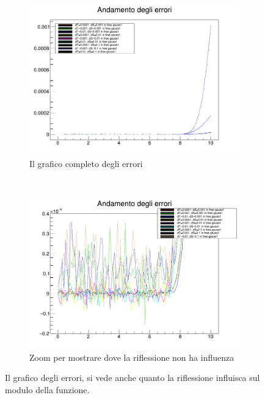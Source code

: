 \begin{figure}[hbt]
  \centering
  \begin{subfigure}[b]{0.45\textwidth}
    \includegraphics[width=\linewidth]{IMG/e_g1full}
    \caption[Errori completo]{Il grafico completo degli errori}\label{fig:fullErr}
  \end{subfigure}
  ~
  \begin{subfigure}[b]{0.45\textwidth}
    \includegraphics[width=\linewidth]{IMG/e_g1res}
    \caption[Errori zoom]{Zoom per mostrare dove la riflessione non ha influenza}\label{fig:fullErrzoom}
  \end{subfigure}
  \caption[Errori completo]{Il grafico degli errori, si vede anche quanto la riflessione influisca sul modulo della funzione.}\label{fig:Err}
\end{figure}

